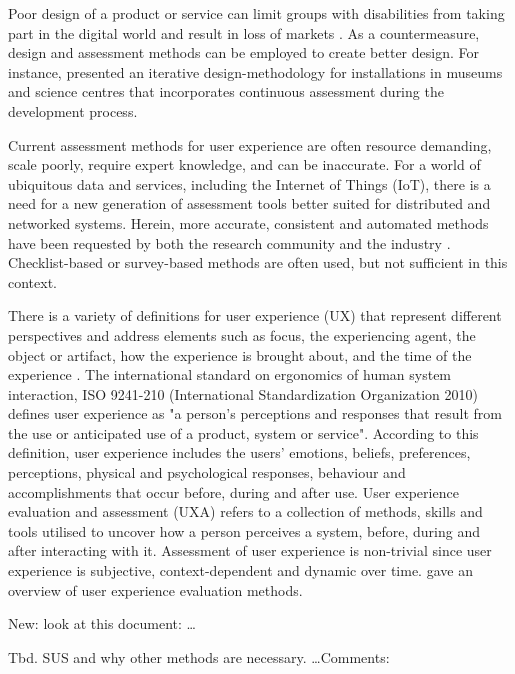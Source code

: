 \documentclass[11pt,english]{nik}
\begin{document}
Poor design of a product or service can limit groups with disabilities from taking part in the digital world \autocite{Bustard2013-gz} and result in loss of markets \autocite{Paz2016-vu}. As a countermeasure, design and assessment methods can be employed to create better design. For instance, \citet{aDesignProcess} presented an iterative design-methodology for installations in museums and science centres that incorporates continuous assessment during the development process.

Current assessment methods for user experience are often resource demanding, scale poorly, require expert knowledge, and can be inaccurate. For a world of ubiquitous data and services, including the Internet of Things (IoT), there is a need for a new generation of assessment tools better suited for distributed and networked systems. Herein, more accurate, consistent and automated methods have been requested by both the research community and the industry \autocite{Vermeeren2010-ub,Bai2016-ed,O_Shea2016-ll}. Checklist-based or survey-based methods are often used, but not sufficient in this context.

There is a variety of definitions for user experience (UX) that represent different perspectives and address elements such as focus, the experiencing agent, the object or artifact, how the experience is brought about, and the time of the experience \autocite{Law:2009:USD:1518701.1518813}. The international standard on ergonomics of human system interaction, ISO 9241-210 (International Standardization Organization 2010) defines user experience as "a person's perceptions and responses that result from the use or anticipated use of a product, system or service". According to this definition, user experience includes the users' emotions, beliefs, preferences, perceptions, physical and psychological responses, behaviour and accomplishments that occur before, during and after use. 
User experience evaluation and assessment (UXA) refers to a collection of methods, skills and tools utilised to uncover how a person perceives a system, before, during and after interacting with it. Assessment of user experience is non-trivial since user experience is subjective, context-dependent and dynamic over time. \citet{Vermeeren2010-ub} gave an overview of user experience evaluation methods.

New: look at this document: \citet{EGGER201935} \dots

Tbd. SUS and why other methods are necessary. \citet{brooke-1996} \dots Comments: \citet{tractinsky-usabilityconstruct}
\end{document}
